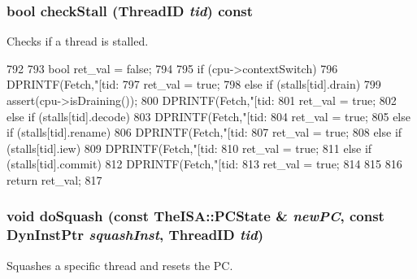 \hypertarget{classDefaultFetch_a6ba4f2f95d991f5be818dabf7500feed}{
\subsubsection[{checkStall}]{\setlength{\rightskip}{0pt plus 5cm}bool checkStall ({\bf ThreadID} {\em tid}) const}}
\label{classDefaultFetch_a6ba4f2f95d991f5be818dabf7500feed}
Checks if a thread is stalled. 


\begin{DoxyCode}
792 {
793     bool ret_val = false;
794 
795     if (cpu->contextSwitch) {
796         DPRINTF(Fetch,"[tid:%
797         ret_val = true;
798     } else if (stalls[tid].drain) {
799         assert(cpu->isDraining());
800         DPRINTF(Fetch,"[tid:%
801         ret_val = true;
802     } else if (stalls[tid].decode) {
803         DPRINTF(Fetch,"[tid:%
804         ret_val = true;
805     } else if (stalls[tid].rename) {
806         DPRINTF(Fetch,"[tid:%
807         ret_val = true;
808     } else if (stalls[tid].iew) {
809         DPRINTF(Fetch,"[tid:%
810         ret_val = true;
811     } else if (stalls[tid].commit) {
812         DPRINTF(Fetch,"[tid:%
813         ret_val = true;
814     }
815 
816     return ret_val;
817 }
\end{DoxyCode}
\hypertarget{classDefaultFetch_a9c960f5de0fbb0511596cba5039660a3}{
\subsubsection[{doSquash}]{\setlength{\rightskip}{0pt plus 5cm}void doSquash (const TheISA::PCState \& {\em newPC}, \/  const {\bf DynInstPtr} {\em squashInst}, \/  {\bf ThreadID} {\em tid})}}
\label{classDefaultFetch_a9c960f5de0fbb0511596cba5039660a3}
Squashes a specific thread and resets the PC. 



